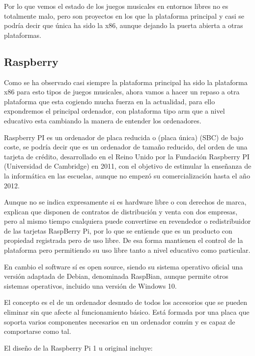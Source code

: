 \documentclass[a4paper,11pt,oneside]{book}
\begin{document}
Por lo que vemos el estado de los juegos musicales en entornos libres no es totalmente malo, pero son proyectos en los que la plataforma principal y casi se podría decir que única ha sido la x86, aunque dejando la puerta abierta a otras plataformas.


\subsection{Raspberry}

Como se ha observado casi siempre la plataforma principal ha sido la plataforma x86 para esto tipos de juegos musicales, ahora vamos a hacer un repaso a otra plataforma que esta cogiendo mucha fuerza en la actualidad, para ello expondremos el principal ordenador, con plataforma tipo arm que a nivel educativo esta cambiando la manera de entender los ordenadores.

Raspberry PI es un ordenador de placa reducida o (placa única) (SBC) de bajo coste, se podría decir que es un ordenador de tamaño reducido, del orden de una tarjeta de crédito, desarrollado en el Reino Unido por la Fundación Raspberry PI (Universidad de Cambridge) en 2011, con el objetivo de estimular la enseñanza de la informática en las escuelas, aunque no empezó su comercialización hasta el año 2012.

Aunque no se indica expresamente si es hardware libre o con derechos de marca, explican que disponen de contratos de distribución y venta con dos empresas, pero al mismo tiempo cualquiera puede convertirse en revendedor o redistribuidor de las tarjetas RaspBerry Pi, por lo que se entiende que es un producto con propiedad registrada pero de uso libre. De esa forma mantienen el control de la plataforma pero permitiendo su uso libre tanto a nivel educativo como particular.


En cambio el software sí es open source, siendo su sistema operativo oficial una versión adaptada de Debian, denominada RaspBian, aunque permite otros sistemas operativos, incluido una versión de Windows 10.

El concepto es el de un ordenador desnudo de todos los accesorios que se pueden eliminar sin que afecte al funcionamiento básico. Está formada por una placa que soporta varios componentes necesarios en un ordenador común y es capaz de comportarse como tal.

El diseño de la Raspberry Pi 1 u original incluye:
\end{document}
